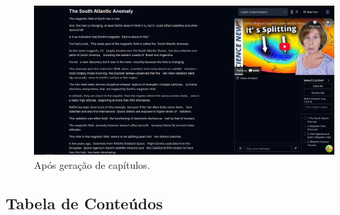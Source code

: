 \documentclass[tcc,capa]{texufpel}
\begin{document}
\begin{figure}[H]
  \centering
  \includegraphics[width=\textwidth,height=0.45\textheight,keepaspectratio]{exemplo-slides/graphics/images/after-chapter-generation.png}
  \caption{Após geração de capítulos.}
  \label{fig:Average_encryption_throughput}
\end{figure}






\subsection{Tabela de Conteúdos}
\end{document}
